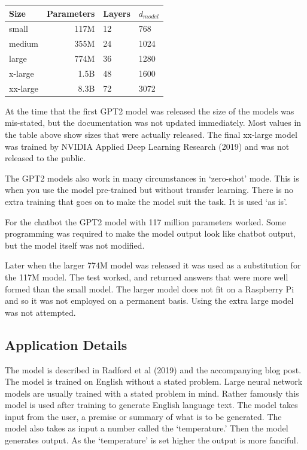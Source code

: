 \begin{center}

\begin{tabular}{lrll}
	Size & Parameters & Layers & $d_{model}$ \\
	\hline
	small & 117M       & 12     & 768          \\
	medium & 355M       & 24     & 1024         \\
	large & 774M       & 36     & 1280         \\
	x-large & 1.5B     & 48     & 1600 \\
	xx-large & 8.3B   &  72 &   3072 
\end{tabular}

	
\end{center}

At the time that the first GPT2 model was released the size of the models was mis-stated, but the documentation was not updated immediately. Most values in the table above show sizes that were actually released. The final xx-large model was trained by NVIDIA Applied Deep Learning Research (2019)\cite{2019NVIDIAadlr} and was not released to the public.

The GPT2 models also work in many circumstances in `zero-shot' mode. This is when you use the model pre-trained but without transfer learning. There is no extra training that goes on to make the model suit the task. It is used `as is'.

For the chatbot the GPT2 model with 117 million parameters worked. Some programming was required to make the model output look like chatbot output, but the model itself was not modified.

Later when the larger 774M model was released it was used as a substitution for the 117M model. The test worked, and returned answers that were more well formed than the small model. The larger model does not fit on a Raspberry Pi and so it was not employed on a permanent basis. Using the extra large model was not attempted.

\subsection*{Application Details}
The model is described in Radford et al (2019)\cite{radford2019language} and the accompanying blog post. The model is trained on English without a stated problem. Large neural network models are usually trained with a stated problem in mind. Rather famously this model is used after training to generate English language text. The model takes input from the user, a premise or summary of what is to be generated. The model also takes as input a number called the `temperature.' Then the model generates output. As the `temperature' is set higher the output is more fanciful. 

